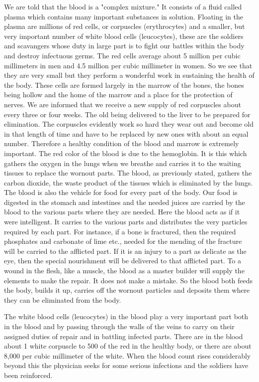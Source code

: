 We are told that the blood is a "complex mixture." It consists of a fluid called plasma which
contains many important substances in solution. Floating in the plasma are millions of red
cells, or corpuscles (erythrocytes) and a smaller, but very important number of white blood
cells (leucocytes), these are the soldiers and scavangers whose duty in large part is to fight
our battles within the body and destroy infectuous germs. The red cells average about 5
million per cubic millimeters in men and 4.5 million per cubic millimeter in women. So we
see that they are very small but they perform a wonderful work in sustaining the health of the
body. These cells are formed largely in the marrow of the bones, the bones being hollow and
the home of the marrow and a place for the protection of nerves. We are informed that we
receive a new supply of red corpuscles about every three or four weeks. The old being
delivered to the liver to be prepared for elimination. The corpuscles evidently work so hard
they wear out and become old in that length of time and have to be replaced by new ones
with about an equal number. Therefore a healthy condition of the blood and marrow is
extremely important. The red color of the blood is due to the hemoglobin. It is this which
gathers the oxygen in the lungs when we breathe and carries it to the waiting tissues to
replace the wornout parts. The blood, as previously stated, gathers the carbon dioxide, the
waste product of the tissues which is eliminated by the lungs. The blood is also the vehicle
for food for every part of the body. Our food is digested in the stomach and intestines and the
needed juices are carried by the blood to the various parts where they are needed. Here the
blood acts as if it were intelligent. It carries to the various parts and distributes the very
particles required by each part. For instance, if a bone is fractured, then the required
phosphates and carbonate of lime etc., needed for the mending of the fracture will be carried
to the afflicted part. If it is an injury to a part as delicate as the eye, then the special
nourishment will be delivered to that afflicted part. To a wound in the flesh, like a muscle,
the blood as a master builder will supply the elements to make the repair. It does not make a
mistake. So the blood both feeds the body, builds it up, carries off the wornout particles and
deposits them where they can be eliminated from the body.

The white blood cells (leucocytes) in the blood play a very important part both in the blood
and by passing through the walls of the veins to carry on their assigned duties of repair and in
battling infected parts. There are in the blood about 1 white corpuscle to 500 of the red in the
healthy body, or there are about 8,000 per cubic millimeter of the white. When the blood
count rises considerably beyond this the physician seeks for some serious infections and the
soldiers have been reinforced.

